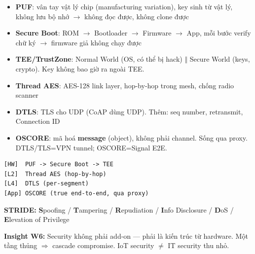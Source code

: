 \documentclass[9pt,a4paper,twocolumn]{article}
\begin{document}
\begin{tcolorbox}[weekbox, title={W6 --- IoT Security (Toàn stack)}]
\begin{itemize}
  \item \textbf{PUF}: vân tay vật lý chip (manufacturing variation), key sinh từ vật lý, không lưu bộ nhớ $\rightarrow$ không đọc được, không clone được
  \item \textbf{Secure Boot}: ROM $\rightarrow$ Bootloader $\rightarrow$ Firmware $\rightarrow$ App, mỗi bước verify chữ ký $\rightarrow$ firmware giả không chạy được
  \item \textbf{TEE/TrustZone}: Normal World (OS, có thể bị hack) $\Vert$ Secure World (keys, crypto). Key không bao giờ ra ngoài TEE.
  \item \textbf{Thread AES}: AES-128 link layer, hop-by-hop trong mesh, chống radio scanner
  \item \textbf{DTLS}: TLS cho UDP (CoAP dùng UDP). Thêm: seq number, retransmit, Connection ID
  \item \textbf{OSCORE}: mã hoá \textbf{message} (object), không phải channel. Sống qua proxy. DTLS/TLS=VPN tunnel; OSCORE=Signal E2E.
\end{itemize}

\begin{lstlisting}
[HW]  PUF -> Secure Boot -> TEE
[L2]  Thread AES (hop-by-hop)
[L4]  DTLS (per-segment)
[App] OSCORE (true end-to-end, qua proxy)
\end{lstlisting}

\textbf{STRIDE:} \textbf{S}poofing / \textbf{T}ampering / \textbf{R}epudiation /
\textbf{I}nfo Disclosure / \textbf{D}oS / \textbf{E}levation of Privilege

\end{tcolorbox}

\begin{tcolorbox}[insightbox]
\scriptsize \textbf{Insight W6:} Security không phải add-on --- phải là kiến trúc từ hardware.
Một tầng thủng $\Rightarrow$ cascade compromise. IoT security $\neq$ IT security thu nhỏ.
\end{tcolorbox}
\end{document}
